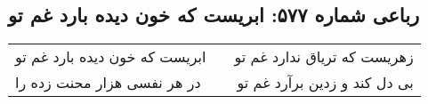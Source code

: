 \begin{center}
\section*{رباعی شماره ۵۷۷: ابریست که خون دیده بارد غم تو}
\label{sec:sh577}
\begin{longtable}{l p{0.5cm} r}
ابریست که خون دیده بارد غم تو
&&
زهریست که تریاق ندارد غم تو
\\
در هر نفسی هزار محنت زده را
&&
بی دل کند و زدین برآرد غم تو
\\
\end{longtable}
\end{center}
